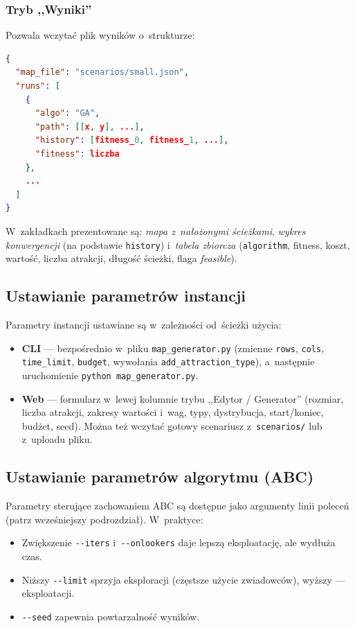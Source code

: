\subsubsection{Tryb ,,Wyniki''}

Pozwala wczytać plik wyników o~strukturze:

\begin{lstlisting}[language=json]
{
  "map_file": "scenarios/small.json",
  "runs": [
    {
      "algo": "GA",
      "path": [[x, y], ...],
      "history": [fitness_0, fitness_1, ...],
      "fitness": liczba
    },
    ...
  ]
}
\end{lstlisting}

W~zakładkach prezentowane są: \emph{mapa z~nałożonymi ścieżkami},
\emph{wykres konwergencji} (na podstawie \texttt{history}) i~\emph{tabela
zbiorcza} (\texttt{algorithm}, fitness, koszt, wartość, liczba atrakcji,
długość ścieżki, flaga \emph{feasible}).

\subsection{Ustawianie parametrów instancji}

Parametry instancji ustawiane są w~zależności od~ścieżki użycia:

\begin{itemize}
    \item \textbf{CLI} --- bezpośrednio w~pliku \texttt{map\_generator.py}
          (zmienne \texttt{rows}, \texttt{cols}, \texttt{time\_limit},
          \texttt{budget}, wywołania \texttt{add\_attraction\_type}),
          a~następnie uruchomienie \texttt{python map\_generator.py}.
    \item \textbf{Web} --- formularz w~lewej kolumnie trybu
          ,,Edytor / Generator'' (rozmiar, liczba atrakcji, zakresy
          wartości i~wag, typy, dystrybucja, start/koniec, budżet, seed).
          Można też wczytać gotowy scenariusz z~\texttt{scenarios/} lub
          z~uploadu pliku.
\end{itemize}

\subsection{Ustawianie parametrów algorytmu (ABC)}

Parametry sterujące zachowaniem ABC są dostępne jako argumenty linii
poleceń (patrz wcześniejszy podrozdział). W~praktyce:
\begin{itemize}
    \item Zwiększenie \texttt{-{}-iters} i~\texttt{-{}-onlookers} daje lepszą
          eksploatację, ale wydłuża czas.
    \item Niższy \texttt{-{}-limit} sprzyja eksploracji (częstsze użycie
          zwiadowców), wyższy --- eksploatacji.
    \item \texttt{-{}-seed} zapewnia powtarzalność wyników.
\end{itemize}

